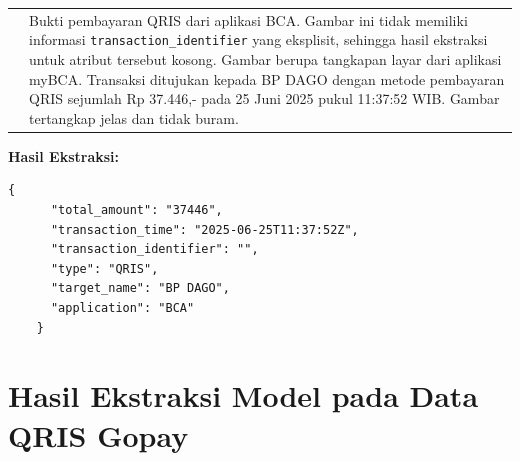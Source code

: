 \begin{table}[h!]
\begin{tabularx}{\textwidth}{m{} X}
        & 
        Bukti pembayaran QRIS dari aplikasi BCA. Gambar ini tidak memiliki informasi \texttt{transaction\_identifier} yang eksplisit, sehingga hasil ekstraksi untuk atribut tersebut kosong. Gambar berupa tangkapan layar dari aplikasi myBCA. Transaksi ditujukan kepada BP DAGO dengan metode pembayaran QRIS sejumlah Rp 37.446,- pada 25 Juni 2025 pukul 11:37:52 WIB. Gambar tertangkap jelas dan tidak buram. \\
    \end{tabularx}
\end{table}

\textbf{Hasil Ekstraksi:}
\begin{lstlisting}[style=jsonstyle]
    {
      "total_amount": "37446",
      "transaction_time": "2025-06-25T11:37:52Z",
      "transaction_identifier": "",
      "type": "QRIS",
      "target_name": "BP DAGO",
      "application": "BCA"
    }
\end{lstlisting}

\clearpage

\section{Hasil Ekstraksi Model pada Data QRIS Gopay}

